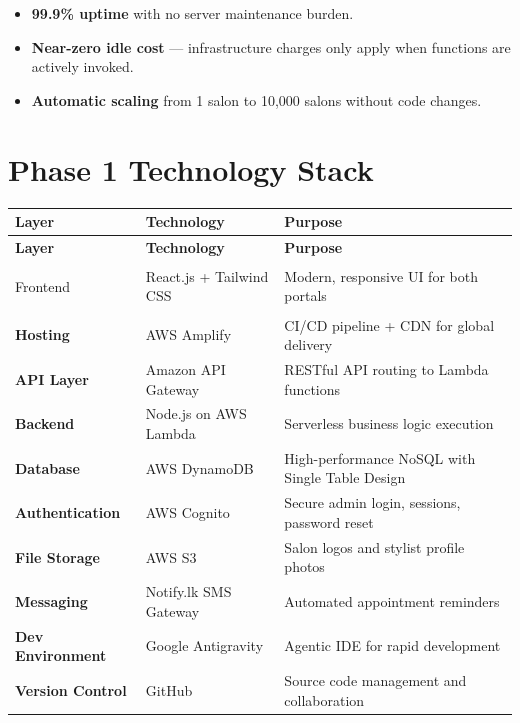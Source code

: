 \documentclass[12pt,a4paper]{report}
\begin{document}
\begin{itemize}[leftmargin=2em]
  \item \textbf{99.9\% uptime} with no server maintenance burden.
  \item \textbf{Near-zero idle cost} — infrastructure charges only apply when
        functions are actively invoked.
  \item \textbf{Automatic scaling} from 1 salon to 10,000 salons without code changes.
\end{itemize}

\section{Phase 1 Technology Stack}

\begin{longtable}{>{\bfseries}p{4cm} p{4.5cm} p{5cm}}
  \toprule
  \textbf{Layer} & \textbf{Technology} & \textbf{Purpose} \\
  \midrule
  \endfirsthead
  \toprule
  \textbf{Layer} & \textbf{Technology} & \textbf{Purpose} \\
  \midrule
  \endhead
  \bottomrule
  \endfoot

  Frontend          & React.js + Tailwind CSS     & Modern, responsive UI for both portals \\[4pt]
  Hosting           & AWS Amplify                 & CI/CD pipeline + CDN for global delivery \\[4pt]
  API Layer         & Amazon API Gateway          & RESTful API routing to Lambda functions \\[4pt]
  Backend           & Node.js on AWS Lambda       & Serverless business logic execution \\[4pt]
  Database          & AWS DynamoDB                & High-performance NoSQL with Single Table Design \\[4pt]
  Authentication    & AWS Cognito                 & Secure admin login, sessions, password reset \\[4pt]
  File Storage      & AWS S3                      & Salon logos and stylist profile photos \\[4pt]
  Messaging         & Notify.lk SMS Gateway       & Automated appointment reminders \\[4pt]
  Dev Environment   & Google Antigravity          & Agentic IDE for rapid development \\[4pt]
  Version Control   & GitHub                      & Source code management and collaboration \\
\end{longtable}
\end{document}
